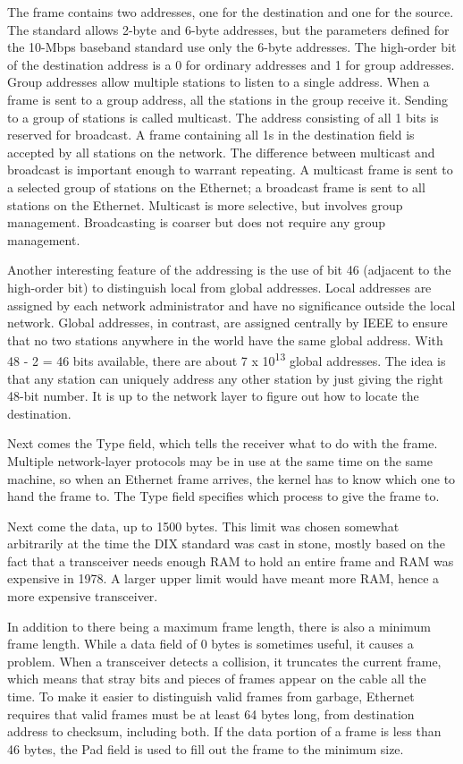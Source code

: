 The frame contains two addresses, one for the destination and one for
the source. The standard allows 2-byte and 6-byte addresses, but the
parameters defined for the 10-Mbps baseband standard use only the 6-byte
addresses. The high-order bit of the destination address is a 0 for
ordinary addresses and 1 for group addresses. Group addresses allow
multiple stations to listen to a single address. When a frame is sent to
a group address, all the stations in the group receive it. Sending to a
group of stations is called {multicast}. The address consisting of all 1
bits is reserved for {broadcast}. A frame containing all 1s in the
destination field is accepted by all stations on the network. The
difference between multicast and broadcast is important enough to
warrant repeating. A multicast frame is sent to a selected group of
stations on the Ethernet; a broadcast frame is sent to all stations on
the Ethernet. Multicast is more selective, but involves group
management. Broadcasting is coarser but does not require any group
management.

Another interesting feature of the addressing is the use of bit 46
(adjacent to the high-order bit) to distinguish local from global
addresses. Local addresses are assigned by each network administrator
and have no significance outside the local network. Global addresses, in
contrast, are assigned centrally by IEEE to ensure that no two stations
anywhere in the world have the same global address. With 48 - 2 = 46
bits available, there are about 7 x 10\textsuperscript{13} global
addresses. The idea is that any station can uniquely address any other
station by just giving the right 48-bit number. It is up to the network
layer to figure out how to locate the destination.

Next comes the {Type} field, which tells the receiver what to do with
the frame. Multiple network-layer protocols may be in use at the same
time on the same machine, so when an Ethernet frame arrives, the kernel
has to know which one to hand the frame to. The {Type} field specifies
which process to give the frame to.

Next come the data, up to 1500 bytes. This limit was chosen somewhat
arbitrarily at the time the DIX standard was cast in stone, mostly based
on the fact that a transceiver needs enough RAM to hold an entire frame
and RAM was expensive in 1978. A larger upper limit would have meant
more RAM, hence a more expensive transceiver.

In addition to there being a maximum frame length, there is also a
minimum frame length. While a data field of 0 bytes is sometimes useful,
it causes a problem. When a transceiver detects a collision, it
truncates the current frame, which means that stray bits and pieces of
frames appear on the cable all the time. To make it easier to
distinguish valid frames from garbage, Ethernet requires that valid
frames must be at least 64 bytes long, from destination address to
checksum, including both. If the data portion of a frame is less than 46
bytes, the {Pad} field is used to fill out the frame to the minimum
size.

